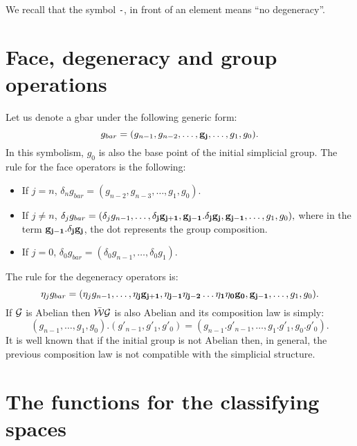 We recall that the symbol {\tt -}, in front of an element means ``no degeneracy''.

\section {Face, degeneracy and group operations}

Let us denote a gbar under the following generic form:
$$g_{bar}=(g_{n-1}, g_{n-2}, \ldots, {\bf g_j}, \ldots, g_1, g_0).$$
In this symbolism, $g_0$ is also the base point of the initial simplicial group.
The rule for the face operators is the following:
\begin{itemize}
\item If $j=n$, $\delta_n g_{bar}= (g_{n-2}, g_{n-3}, \ldots, g_1, g_0).$
\item If $j \not=n$, 
  $\delta_j g_{bar}= (\delta_j g_{n-1}, \ldots, {\bf \delta_j g_{j+1}, g_{j-1}.\delta_j g_j, g_{j-1}}, \ldots, g_1, g_0),$
where in the term $\bf g_{j-1}.\delta_j g_j$, the dot represents the group composition.
\item If $j=0$, $\delta_0 g_{bar}= (\delta_0 g_{n-1}, \ldots, \delta_0 g_1).$
\end{itemize}
The rule for the degeneracy operators is:
$$\eta_j g_{bar}= 
 (\eta_j g_{n-1}, \ldots, {\bf \eta_j g_{j+1}, \eta_{j-1}\eta_{j-2}\ldots\eta_1\eta_0 g_0, g_{j-1}}, \ldots, g_1, g_0).$$
If ${\cal G}$ is Abelian then $\bar{\cal W}{\cal G}$ is also  Abelian  and its
composition law is simply:
$$(g_{n-1}, \ldots, g_1, g_0).(g'_{n-1}, g'_1, g'_0)= 
  (g_{n-1}.g'_{n-1},  \ldots, g_1.g'_1, g_0.g'_0).$$
It is well known that if the initial group is not Abelian then, in general, the previous
composition law is not compatible with the simplicial structure.

\section {The functions for the classifying spaces}

